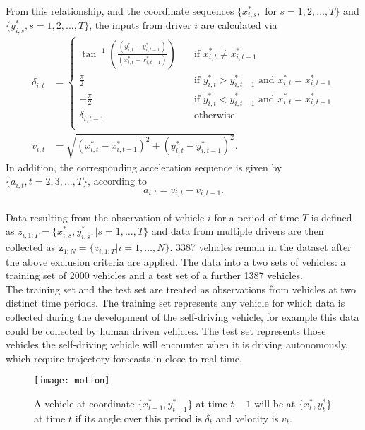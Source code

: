 \documentclass[12pt,a4paper]{article}\usepackage[]{graphicx}\usepackage[]{color}
\begin{document}
From this relationship, and the coordinate sequences $\{x^*_{i, s}, \mbox{ for }s=1,2,...,T\}$ and $\{y^*_{i, s}, s=1,2,...,T\}$, the inputs from driver $i$ are calculated via
\begin{align}
\delta_{i, t} &= 
     \begin{cases}
       \tan^{-1}\left(\frac{(y^*_{i, t} - y^*_{i, t-1})}{(x^*_{i, t} - x^*_{i, t-1})} \right)  &\quad\text{if }x^*_{i, t} \neq x^*_{i, t-1} \\
       \frac{\pi}{2} &\quad\text{if } y^*_{i, t} > y^*_{i, t-1} \mbox{ and } x^*_{i, t} = x^*_{i, t-1} \\
       -\frac{\pi}{2} &\quad\text{if } y^*_{i, t} < y^*_{i, t-1} \mbox{ and } x^*_{i, t} = x^*_{i, t-1} \\
       \delta_{i, t-1} &\quad\text{otherwise} \\ 
     \end{cases} \label{dEq} \\
v_{i, t} &= \sqrt{(x^*_{i, t} - x^*_{i, t-1})^2 + (y^*_{i, t} - y^*_{i, t-1})^2} \label{vEq}.
\end{align}
In addition, the corresponding acceleration sequence is given by $\{a_{i, t},t=2,3,...,T\}$, according to
\begin{equation}
\label{aEq}
a_{i, t} = v_{i, t} - v_{i, t-1}. 
\end{equation}
\\

Data resulting from the observation of vehicle $i$ for a period of time $T$ is defined as $z_{i, 1:T} = \{x^*_{i, s}, y^*_{i, s}, | s = 1, \dots, T\}$ and data from multiple drivers are then collected as $\mathbf{z}_{1:N} = \{z_{i, 1:T} | i = 1, \dots, N\}$. 3387 vehicles remain in the dataset after the above exclusion criteria are applied. The data into a two sets of vehicles: a training set of 2000 vehicles and a test set of a further 1387 vehicles.
\\

The training set and the test set are treated as observations from vehicles at two distinct time periods. The training set represents any vehicle for which data is collected during the development of the self-driving vehicle, for example this data could be collected by human driven vehicles. The test set represents those vehicles the self-driving vehicle will encounter when it is driving autonomously, which require trajectory forecasts in close to real time.

\begin{figure}
\centering
\texttt{[image: motion]}
\caption{A vehicle at coordinate $\{x^*_{t-1}, y^*_{t-1}\}$ at time $t-1$ will be at $\{x^*_t, y^*_t\}$ at time $t$ if its angle over this period is $\delta_t$ and velocity is $v_t$.}
\label{fig:motion}
\end{figure}
\end{document}
